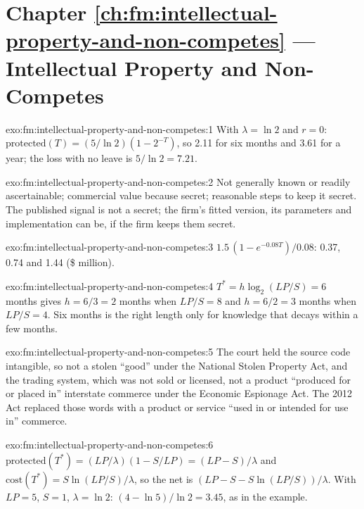 \section*{Chapter \ref{ch:fm:intellectual-property-and-non-competes} --- Intellectual Property and Non-Competes}

\begin{solution}{exo:fm:intellectual-property-and-non-competes:1}
With $\lambda=\ln2$ and $r=0$: $\text{protected}(T)=(5/\ln2)(1-2^{-T})$, so 2.11 for six months and 3.61 for a year; the loss with no leave is
$5/\ln2=7.21$.
\end{solution}

\begin{solution}{exo:fm:intellectual-property-and-non-competes:2}
Not generally known or readily ascertainable; commercial value because secret; reasonable steps to keep it secret. The published signal is not a
secret; the firm's fitted version, its parameters and implementation can be, if the firm keeps them secret.
\end{solution}

\begin{solution}{exo:fm:intellectual-property-and-non-competes:3}
$1.5\,(1-e^{-0.08T})/0.08$: 0.37, 0.74 and 1.44 (\$ million).
\end{solution}

\begin{solution}{exo:fm:intellectual-property-and-non-competes:4}
$T^*=h\log_2(LP/S)=6$ months gives $h=6/3=2$ months when $LP/S=8$ and $h=6/2=3$ months when $LP/S=4$. Six months is the right length only for
knowledge that decays within a few months.
\end{solution}

\begin{solution}{exo:fm:intellectual-property-and-non-competes:5}
The court held the source code intangible, so not a stolen ``good'' under the National Stolen Property Act, and the trading system, which was not
sold or licensed, not a product ``produced for or placed in'' interstate commerce under the Economic Espionage Act. The 2012 Act replaced those
words with a product or service ``used in or intended for use in'' commerce.
\end{solution}

\begin{solution}{exo:fm:intellectual-property-and-non-competes:6}
$\text{protected}(T^*)=(LP/\lambda)(1-S/LP)=(LP-S)/\lambda$ and $\text{cost}(T^*)=S\ln(LP/S)/\lambda$, so the net is $(LP-S-S\ln(LP/S))/\lambda$.
With $LP=5$, $S=1$, $\lambda=\ln2$: $(4-\ln5)/\ln2=3.45$, as in the example.
\end{solution}

